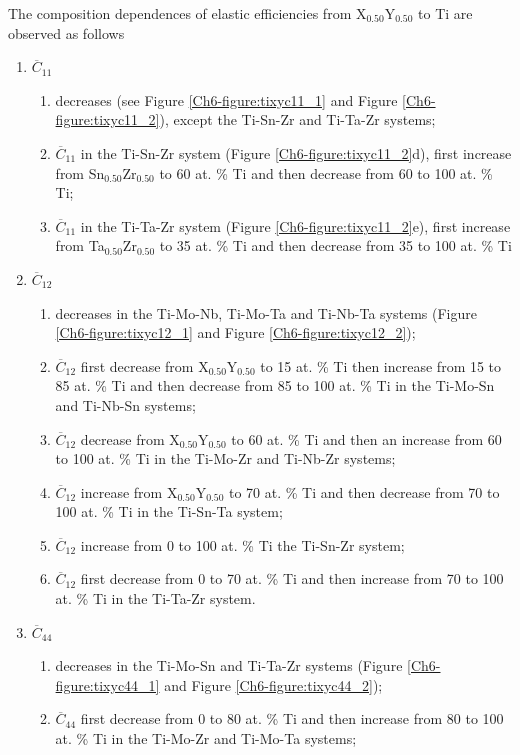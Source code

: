The composition dependences of elastic efficiencies from X$_{0.50}$Y$_{0.50}$ to Ti are observed as follows
\begin{enumerate}
	\item $\overline{C}_{11}$
	\begin{enumerate}
		\item decreases (see Figure \ref{Ch6-figure:tixyc11_1} and Figure \ref{Ch6-figure:tixyc11_2}), except the Ti-Sn-Zr and Ti-Ta-Zr systems;
		\item $\overline{C}_{11}$ in the Ti-Sn-Zr system (Figure \ref{Ch6-figure:tixyc11_2}d), first increase from Sn$_{0.50}$Zr$_{0.50}$ to 60 at. \% Ti and then decrease from 60 to 100 at. \% Ti;
		\item $\overline{C}_{11}$ in the Ti-Ta-Zr system (Figure \ref{Ch6-figure:tixyc11_2}e), first increase from Ta$_{0.50}$Zr$_{0.50}$ to 35 at. \% Ti and then decrease from 35 to 100 at. \% Ti
	\end{enumerate}
	\item $\overline{C}_{12}$
	\begin{enumerate}
		\item decreases in the Ti-Mo-Nb, Ti-Mo-Ta and Ti-Nb-Ta systems (Figure \ref{Ch6-figure:tixyc12_1} and Figure \ref{Ch6-figure:tixyc12_2});
		\item $\overline{C}_{12}$ first decrease from X$_{0.50}$Y$_{0.50}$ to 15 at. \% Ti then increase from 15 to 85 at. \% Ti and then decrease from 85 to 100 at. \% Ti in the Ti-Mo-Sn and Ti-Nb-Sn systems;
		\item $\overline{C}_{12}$ decrease from X$_{0.50}$Y$_{0.50}$ to 60 at. \% Ti and then an increase from 60 to 100 at. \% Ti in the Ti-Mo-Zr and Ti-Nb-Zr systems;
		\item $\overline{C}_{12}$ increase from X$_{0.50}$Y$_{0.50}$ to 70 at. \% Ti and then decrease from 70 to 100 at. \% Ti in the Ti-Sn-Ta system;
		\item $\overline{C}_{12}$ increase from 0 to 100 at. \% Ti the Ti-Sn-Zr system;
		\item $\overline{C}_{12}$ first decrease from 0 to 70 at. \% Ti and then increase from 70 to 100 at. \% Ti in the Ti-Ta-Zr system. 
	\end{enumerate}
	\item $\overline{C}_{44}$
	\begin{enumerate}
		\item decreases in the Ti-Mo-Sn and Ti-Ta-Zr systems (Figure \ref{Ch6-figure:tixyc44_1} and Figure \ref{Ch6-figure:tixyc44_2});
		\item $\overline{C}_{44}$ first decrease from 0 to 80 at. \% Ti and then increase from 80 to 100 at. \% Ti in the Ti-Mo-Zr and Ti-Mo-Ta systems;

\end{enumerate}
\end{enumerate}
